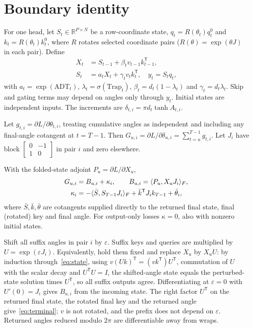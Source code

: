\section{Boundary identity}\label{sec:identity}
For one head, let $S_t\in\mathbb R^{P\times N}$ be a row-coordinate state, $q_t=R(\theta_t)q_t^0$ and $k_t=R(\theta_t)k_t^0$, where $R$ rotates selected coordinate pairs ($R(\theta)=\exp(\theta J)$ in each pair). Define
\begin{align}
X_t&=S_{t-1}+\beta_t v_{t-1}k_{t-1}^{\mathsf T},\label{eq:fold}\\
S_t&=a_tX_t+\gamma_t v_tk_t^{\mathsf T},\quad y_t=S_tq_t,\label{eq:state}
\end{align}
with $a_t=\exp(\mathrm{ADT}_t)$, $\lambda_t=\sigma(\mathrm{Trap}_t)$, $\beta_t=d_t(1-\lambda_t)$ and $\gamma_t=d_t\lambda_t$. Skip and gating terms may depend on angles only through $y_t$. Initial states are independent inputs. The increments are $\delta_{t,i}=\pi d_t\tanh A_{t,i}$.

Let $g_{t,i}=\partial L/\partial\theta_{t,i}$, treating cumulative angles as independent and including any final-angle cotangent at $t=T-1$. Then $G_{u,i}=\partial L/\partial\delta_{u,i}=\sum_{t=u}^{T-1}g_{t,i}$. Let $J_i$ have block $\left[\begin{smallmatrix}0&-1\\1&0\end{smallmatrix}\right]$ in pair $i$ and zero elsewhere.

\begin{proposition}\label{prop:boundary}
With the folded-state adjoint $P_u=\partial L/\partial X_u$,
\begin{align}
G_{u,i}&=B_{u,i}+\kappa_i,\qquad B_{u,i}=\langle P_u,X_uJ_i\rangle_F,\label{eq:boundary}\\
\kappa_i&=-\langle \bar S,S_{T-1}J_i\rangle_F+\bar k^{\mathsf T}J_i k_{T-1}+\bar\theta_i,\label{eq:terminal}
\end{align}
where $\bar S,\bar k,\bar\theta$ are cotangents supplied directly to the returned final state, final (rotated) key and final angle. For output-only losses $\kappa=0$, also with nonzero initial states.
\end{proposition}
\begin{IEEEproof}
Shift all suffix angles in pair $i$ by $\varepsilon$. Suffix keys and queries are multiplied by $U=\exp(\varepsilon J_i)$. Equivalently, hold them fixed and replace $X_u$ by $X_uU$: by induction through~\eqref{eq:state}, using $v(Uk)^{\mathsf T}=(vk^{\mathsf T})U^{\mathsf T}$, commutation of $U$ with the scalar decay and $U^{\mathsf T}U=I$, the shifted-angle state equals the perturbed-state solution times $U^{\mathsf T}$, so all suffix outputs agree. Differentiating at $\varepsilon=0$ with $U'(0)=J_i$ gives $B_{u,i}$ from the incoming state. The right factor $U^{\mathsf T}$ on the returned final state, the rotated final key and the returned angle give~\eqref{eq:terminal}; $v$ is not rotated, and the prefix does not depend on $\varepsilon$. Returned angles reduced modulo $2\pi$ are differentiable away from wraps.
\end{IEEEproof}

